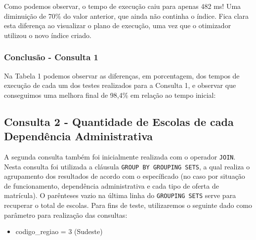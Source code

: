 \documentclass[12pt,a4paper]{article}
\begin{document}
Como podemos observar, o tempo de execução caiu para apenas 482 ms! Uma diminuição de 70\% do valor anterior, que ainda não continha o índice. Fica clara esta diferença ao visualizar o plano de execução, uma vez que o otimizador utilizou o novo índice criado.


\subsubsection{Conclusão - Consulta 1}
\vspace{0.5cm}
Na Tabela 1 podemos observar as diferenças, em porcentagem, dos tempos de execução de cada um dos testes realizados para a Consulta 1, e observar que conseguimos uma melhora final de 98,4\% em relação ao tempo inicial:

\begin{table}[htbp]
  \centering
  \caption{Comparação Consulta 1}
  \label{tab:compconsulta1}%
\end{table}%


\subsection{Consulta 2 - Quantidade de Escolas de cada Dependência Administrativa}

A segunda consulta também foi inicialmente realizada com o operador \texttt{JOIN}. Nesta consulta foi utilizada a cláusula \texttt{GROUP BY GROUPING SETS}, a qual realiza o agrupamento dos resultados de acordo com o específicado (no caso por situação de funcionamento, dependência administrativa e cada tipo de oferta de matrícula). O parênteses vazio na última linha do \texttt{GROUPING SETS} serve para recuperar o total de escolas. Para fins de teste, utilizaremos o seguinte dado como parâmetro para realização das consultas: 
\begin{itemize}
    \item codigo\_regiao = 3 (Sudeste)
\end{itemize}
\end{document}
